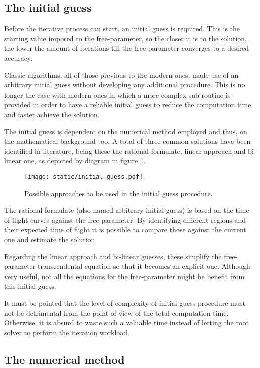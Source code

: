 \subsection{The initial guess}

Before the iterative process can start, an initial guess is required. This is
the starting value imposed to the free-parameter, so the closer it is to the
solution, the lower the amount of iterations till the free-parameter converges
to a desired accuracy.

Classic algorithms, all of those previous to the modern ones, made use of an
arbitrary initial guess without developing any additional procedure. This is no
longer the case with modern ones in which a more complex sub-routine is provided
in order to have a reliable initial guess to reduce the computation time and
faster achieve the solution.

The initial guess is dependent on the numerical method employed and thus, on the
mathematical background too. A total of three common solutions have been
identified in literature, being these the rational formulate, linear approach
and bi-linear one, as depicted by diagram in figure \ref{fig:initial_guess}.

\vspace{0.5cm}
\begin{figure}[h]
  \centering
  \texttt{[image: static/initial\_guess.pdf]}
  \caption{Possible approaches to be used in the initial guess procedure.}
  \label{fig:initial_guess}
\end{figure}

The rational formulate (also named arbitrary initial guess) is based on the time
of flight curves against the free-parameter. By identifying different regions
and their expected time of flight it is possible to compare those against the
current one and estimate the solution.

Regarding the linear approach and bi-linear guesses, these simplify the
free-parameter transcendental equation so that it becomes an explicit one.
Although very useful, not all the equations for the free-parameter might be
benefit from this initial guess.

It must be pointed that the level of complexity of initial guess procedure must
not be detrimental from the point of view of the total computation time.
Otherwise, it is absurd to waste such a valuable time instead of letting the
root solver to perform the iteration workload.

\subsection{The numerical method}
\label{sec:numerical_method}

